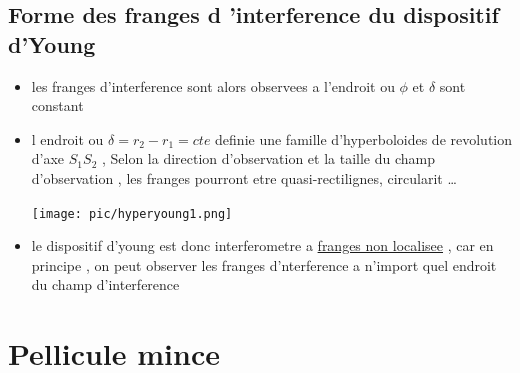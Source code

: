\documentclass[12pt]{book}
\begin{document}
            \subsection{Forme des franges d 'interference du dispositif d'Young}
                \begin{itemize}
                    \item les franges d'interference sont alors observees a l'endroit ou $\phi$ et $\delta$ sont constant 
                    \item 
                        \begin{minipage}{0.49\linewidth}
                            l endroit ou $\delta=r_2-r_1=cte$ definie une famille d'hyperboloides de revolution d'axe $S_1 S_2$ , Selon la direction d'observation et la taille du champ d'observation ,
                        les  franges pourront etre quasi-rectilignes, circularit \ldots
                        \end{minipage}
                        \begin{minipage}{0.49\linewidth}
                            \texttt{[image: pic/hyperyoung1.png]}
                        \end{minipage}
                    \item le dispositif d'young est donc interferometre a \underline{franges non localisee} , car en principe , on peut observer les franges d'nterference a n'import quel endroit du champ d'interference
                \end{itemize}
                \pagebreak
        \section{Pellicule mince}
            
\end{document}
